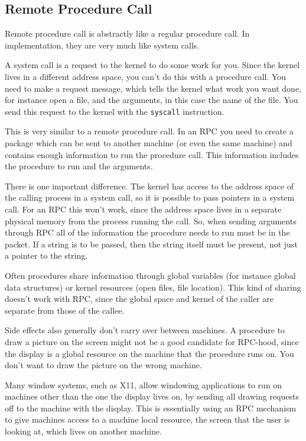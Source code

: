 \subsection{Remote Procedure Call}

Remote procedure call is abstractly like a regular procedure call.  In 
implementation, they are very much like system calls.

A system call
is a request to the kernel to do some work for you.  Since the kernel
lives in a different address space, you can't do this with a procedure call.
You need to make a request message, which tells the kernel what work you
want done, for instance open a file, and the arguments, in this case
the name of the file.  You send this request to the kernel with the
{\tt syscall} instruction.

This is very similar to a remote procedure call.  In an RPC you need to
create a package which can be sent to another machine (or even the same
machine) and contains enough information to run the procedure call.
This information includes the procedure to run and the arguments.  

There is one important difference.
The kernel has access to the address space of the calling process in a system
call, so it is possible to pass pointers in a system call.  For an RPC this
won't work, since the address space lives in a separate physical memory from
the process running the call.  So, when sending arguments through RPC all
of the information the procedure needs to run must be in the packet.  If
a string is to be passed, then the string itself must be present, not just
a pointer to the string.

Often procedures share information through global variables (for instance 
global data structures) or kernel resources (open files, file location).
This kind of sharing doesn't work with RPC, since the global space and kernel
of the caller are separate from those of the callee.	

Side effects also generally don't carry over between machines.
A procedure to draw a picture on the screen might not be a good candidate for
RPC-hood, since the display is a global resource on the machine that the
procedure runs on.  You don't want to draw the picture on the wrong machine.

Many window systems, such as X11, allow windowing applications to
run on machines other than the one the display lives on, by sending all 
drawing requests off to the machine with the display.  This is essentially 
using an RPC mechanism to give machines access to a machine local resource,
the screen that the user is looking at, which lives on another machine.

